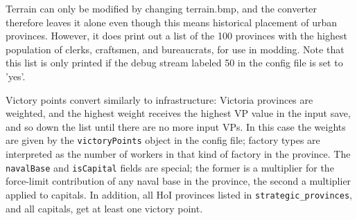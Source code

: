 \documentclass[12pt,ebook,oneside]{book}
\begin{document}
Terrain can only be modified by changing terrain.bmp, and the
converter therefore leaves it alone even though this means historical
placement of urban provinces. However, it does print out a list of the
100 provinces with the highest population of clerks, craftsmen, and
bureaucrats, for use in modding. Note that this list is only printed
if the debug stream labeled 50 in the config file is set to 'yes'. 

Victory points convert similarly to infrastructure: Victoria provinces
are weighted, and the highest weight receives the highest VP value in
the input save, and so down the list until there are no more input
VPs. In this case the weights are given by the \texttt{victoryPoints}
object in the config file; factory types are interpreted as the number
of workers in that kind of factory in the province. The
\texttt{navalBase} and \texttt{isCapital} fields are special; the
former is a multiplier for the force-limit contribution of any naval
base in the province, the second a multiplier applied to capitals. In addition,
all HoI provinces listed in \texttt{strategic\_provinces}, and all
capitals, get at least one victory point. 
\end{document}
